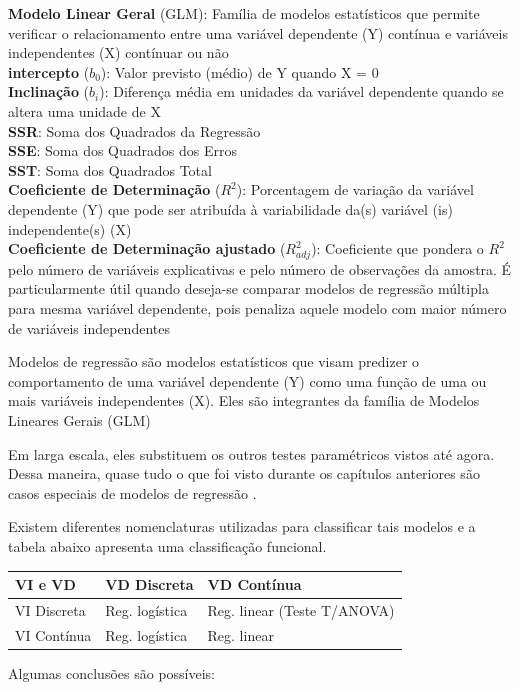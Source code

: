 \documentclass[
]{book}
\begin{document}
\textbf{Modelo Linear Geral} (GLM): Família de modelos estatísticos que permite verificar o relacionamento entre uma variável dependente (Y) contínua e variáveis independentes (X) contínuar ou não\\
\textbf{intercepto} (\(b_0\)): Valor previsto (médio) de Y quando X = 0\\
\textbf{Inclinação} (\(b_i\)): Diferença média em unidades da variável dependente quando se altera uma unidade de X\\
\textbf{SSR}: Soma dos Quadrados da Regressão\\
\textbf{SSE}: Soma dos Quadrados dos Erros\\
\textbf{SST}: Soma dos Quadrados Total\\
\textbf{Coeficiente de Determinação} (\(R^2\)): Porcentagem de variação da variável dependente (Y) que pode ser atribuída à variabilidade da(s) variável (is) independente(s) (X)\\
\textbf{Coeficiente de Determinação ajustado} (\(R^2_{adj}\)): Coeficiente que pondera o \(R^2\) pelo número de variáveis explicativas e pelo número de observações da amostra. É particularmente útil quando deseja-se comparar modelos de regressão múltipla para mesma variável dependente, pois penaliza aquele modelo com maior número de variáveis independentes

Modelos de regressão são modelos estatísticos que visam predizer o comportamento de uma variável dependente (Y) como uma função de uma ou mais variáveis independentes (X). Eles são integrantes da família de Modelos Lineares Gerais (GLM)

Em larga escala, eles substituem os outros testes paramétricos vistos até agora. Dessa maneira, quase tudo o que foi visto durante os capítulos anteriores são casos especiais de modelos de regressão \citep{Chartier2008}.

Existem diferentes nomenclaturas utilizadas para classificar tais modelos e a tabela abaixo apresenta uma classificação funcional.

\begin{longtable}[]{@{}lll@{}}
\toprule
VI e VD & VD Discreta & VD Contínua\tabularnewline
\midrule
\endhead
VI Discreta & Reg. logística & Reg. linear (Teste T/ANOVA)\tabularnewline
VI Contínua & Reg. logística & Reg. linear\tabularnewline
\bottomrule
\end{longtable}

Algumas conclusões são possíveis:
\end{document}
